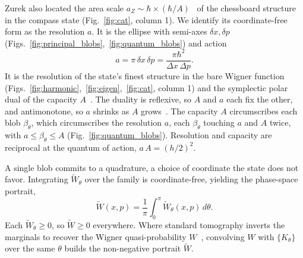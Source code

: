 \documentclass[aps,prl,reprint,amsmath,amssymb,floatfix,nofootinbib]{revtex4-2}
\begin{document}
Zurek also located the area scale $a_Z \sim \hbar \times (\hbar / A)$~\cite{zurek2001,zurek2003decoherence} of the chessboard structure in the compass state (Fig.~\ref{fig:cat}, column 1). We identify its coordinate-free form as the resolution $a$. It is the ellipse with semi-axes $\delta x, \delta p$ (Figs.~\ref{fig:principal_blobs},~\ref{fig:quantum_blobs}) and action
\begin{equation}
a = \pi\,\delta x\,\delta p = \frac{\pi\hbar^2}{\Delta x\,\Delta p}.
\label{eq:tildea}
\end{equation}
It is the resolution of the state's finest structure in the bare Wigner function (Figs.~\ref{fig:harmonic},~\ref{fig:eigen},~\ref{fig:cat},
column 1) and the symplectic polar dual of the capacity $A$~\cite{degosson2015indeterminacy}. The duality is reflexive, so $A$ and $a$ each fix the other, and antimonotone, so $a$ shrinks as $A$ grows~\cite{degosson2022polar}. The capacity $A$ circumscribes each blob $\beta_\theta$, which circumscribes the resolution $a$, each $\beta_\theta$ touching $a$ and $A$ twice, with $a \le \beta_\theta \le A$ (Fig.~\ref{fig:quantum_blobs}). Resolution and capacity are reciprocal at the quantum of action, $a\,A = (h/2)^2$.


A single blob commits to a quadrature, a choice of coordinate the state does not favor. Integrating $\widetilde W_\theta$ over the family is coordinate-free, yielding the phase-space portrait,
\begin{equation}
\widetilde{W}(x,p) = \frac{1}{\pi}\int_0^\pi \widetilde W_\theta(x,p)\,d\theta.
\label{eq:tildeW}
\end{equation}
Each $\widetilde W_\theta \ge 0$, so $\widetilde W \ge 0$ everywhere. Where standard tomography inverts the marginals to recover the Wigner quasi-probability $W$~\cite{vogelrisken1989,lvovsky2009}, convolving $W$ with $\{K_\theta\}$ over the same $\theta$ builds the non-negative portrait $\widetilde W$.
\end{document}
